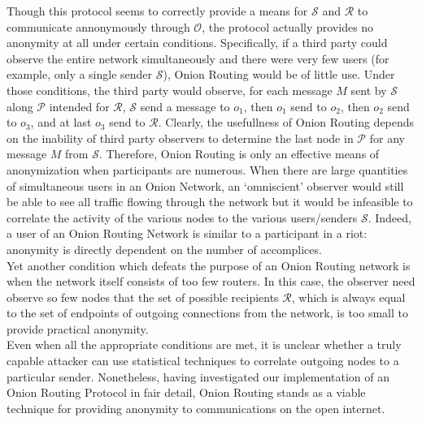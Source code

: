 \documentclass[10pt]{report}
\begin{document}
Though this protocol seems to correctly provide a means for $\mathcal{S}$ and $\mathcal{R}$ to communicate
annonymously through $\mathcal{O}$, the protocol actually provides no anonymity at all under certain conditions.
Specifically, if a third party could observe the entire network simultaneously and there were very few users
(for example, only a single sender $\mathcal{S}$), Onion Routing would be of little use.  Under those conditions,
the third party would observe, for each message $M$ sent by $\mathcal{S}$ along $\mathcal{P}$ intended for
$\mathcal{R}$, $\mathcal{S}$ send a message to $o_1$, then $o_1$ send to $o_2$, then $o_2$ send to $o_3$, and
at last $o_3$ send to $\mathcal{R}$.  Clearly, the usefullness of Onion Routing depends on the inability of
third party observers to determine the last node in $\mathcal{P}$ for any message $M$ from $\mathcal{S}$.
Therefore, Onion Routing is only an effective means of anonymization when participants are numerous.
When there are
large quantities of simultaneous users in an Onion Network, an `omniscient' observer would still be able
to see all traffic flowing through the network but it would be infeasible to correlate the activity of the
various nodes to the various users/senders $\mathcal{S}$.  Indeed, a user of an Onion Routing Network is similar
to a participant in a riot: anonymity is directly dependent on the number of accomplices.\\

Yet another condition which defeats the purpose of an Onion Routing network is when the network itself consists
of too few routers.  In this case, the observer need observe so few nodes that the set of possible recipients
$\mathcal{R}$, which is always equal to the set of endpoints of outgoing connections from the network, is too
small to provide practical anonymity.\\

Even when all the appropriate conditions are met, it is unclear whether a truly capable attacker can use
statistical techniques to correlate outgoing nodes to a particular sender.  Nonetheless, having investigated
our implementation of an Onion Routing Protocol in fair detail, Onion Routing stands as a viable technique for
providing anonymity to communications on the open internet.
\end{document}
